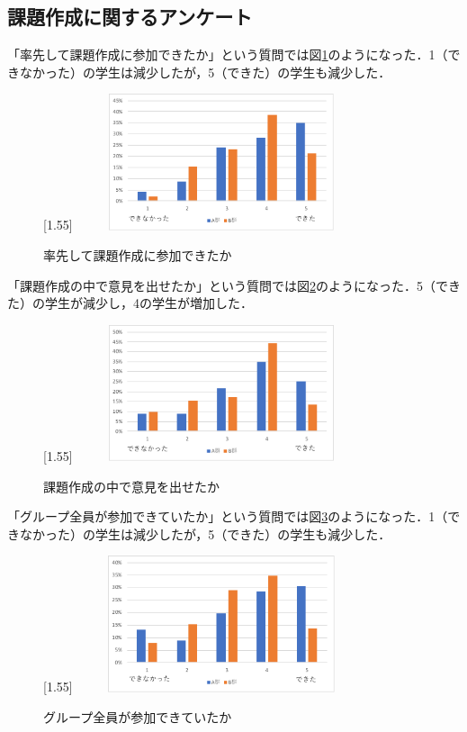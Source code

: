 \documentclass[a4j,11pt]{jsarticle}
\begin{document}
\newpage

\subsection{課題作成に関するアンケート}
「率先して課題作成に参加できたか」という質問では図\ref{anke5}のようになった．1（できなかった）の学生は減少したが，5（できた）の学生も減少した．

\begin{figure}[h]
\begin{center}
\scalebox{1.2}[1.55]{
 \includegraphics[clip,width=85mm,height=40mm]{anke5.pdf}
 }
\end{center}
 \caption{率先して課題作成に参加できたか}
 \label{anke5}
\end{figure}



「課題作成の中で意見を出せたか」という質問では図\ref{anke6}のようになった．5（できた）の学生が減少し，4の学生が増加した．


\begin{figure}[h]
\begin{center}
\scalebox{1.2}[1.55]{
 \includegraphics[clip,width=85mm,height=40mm]{anke6.pdf}
 }
\end{center}
 \caption{課題作成の中で意見を出せたか}
 \label{anke6}
\end{figure}

\newpage

「グループ全員が参加できていたか」という質問では図\ref{anke7}のようになった．1（できなかった）の学生は減少したが，5（できた）の学生も減少した．


\begin{figure}[h]
\begin{center}
\scalebox{1.2}[1.55]{
 \includegraphics[clip,width=85mm,height=40mm]{anke7.pdf}
 }
\end{center}
 \caption{グループ全員が参加できていたか}
 \label{anke7}
\end{figure}
\end{document}
